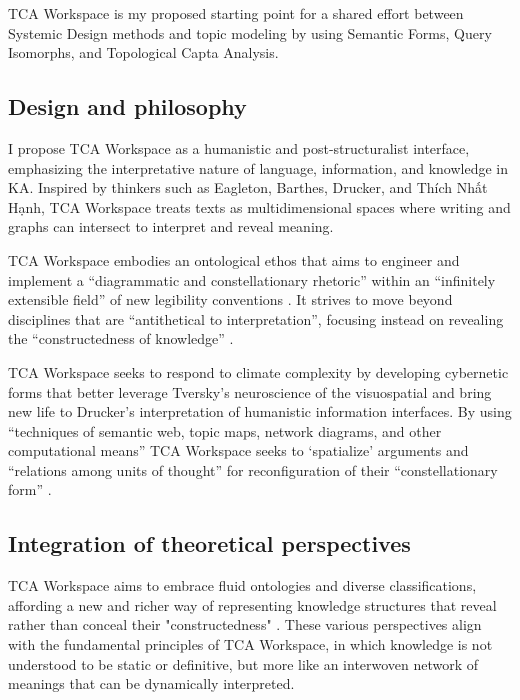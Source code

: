 TCA Workspace is my proposed starting point for a shared effort between Systemic Design methods and topic modeling by using Semantic Forms, Query Isomorphs, and Topological Capta Analysis. 

\subsection{Design and philosophy}

I propose TCA Workspace as a humanistic and post-structuralist interface, emphasizing the interpretative nature of language, information, and knowledge in KA. Inspired by thinkers such as Eagleton, Barthes, Drucker, and Thích Nhất Hạnh, TCA Workspace treats texts as multidimensional spaces where writing and graphs can intersect to interpret and reveal meaning. 

TCA Workspace embodies an ontological ethos that aims to engineer and implement a “diagrammatic and constellationary rhetoric” within an “infinitely extensible field” of new legibility conventions \citep[p. 197]{drucker_graphesis_2014}. It strives to move beyond disciplines that are “antithetical to interpretation”, focusing instead on revealing the “constructedness of knowledge” \citep[p. 178] {drucker_graphesis_2014}.


TCA Workspace seeks to respond to climate complexity by developing cybernetic forms that better leverage Tversky’s neuroscience of the visuospatial \citep{tversky_barbara_2022} and bring new life to Drucker’s interpretation of humanistic information interfaces. By using “techniques of semantic web, topic maps, network diagrams, and other computational means” TCA Workspace seeks to ‘spatialize’ arguments and “relations among units of thought” for reconfiguration of their “constellationary form” \citep[p. 158] {drucker_graphesis_2014}.



\subsection{Integration of theoretical perspectives}
TCA Workspace aims to embrace fluid ontologies and diverse classifications, affording a new and richer way of representing knowledge structures that reveal rather than conceal their "constructedness" \citep[p. 178]{drucker_graphesis_2014}. These various perspectives align with the fundamental principles of TCA Workspace, in which knowledge is not understood to be static or definitive, but more like an interwoven network of meanings that can be dynamically interpreted.

